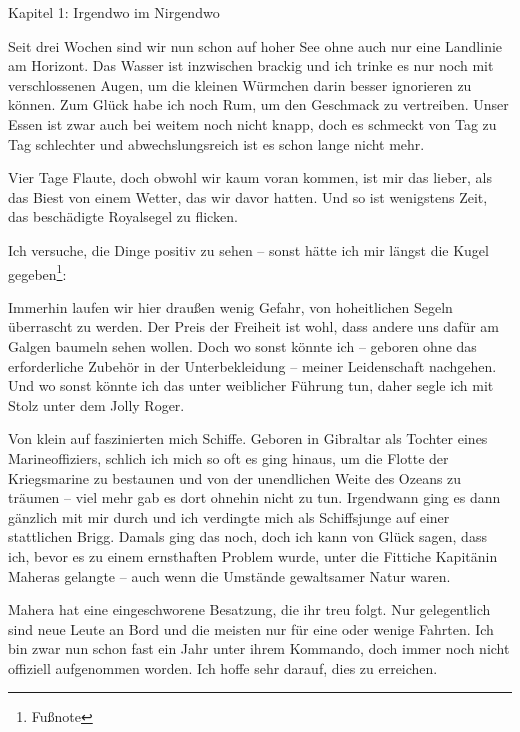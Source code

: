 
{\label{0Kapitel 1: Irgendwo im Nirgendwo}\vspace{0.5cm}\noindent\LARGE Kapitel 1: Irgendwo im Nirgendwo}
\renewcommand{\storychapter}{Kapitel 1: Irgendwo im Nirgendwo}

\vspace{0.5cm}\noindent
Seit drei Wochen sind wir nun schon auf hoher See ohne auch nur eine Landlinie am Horizont. Das Wasser ist inzwischen brackig und ich trinke es nur noch mit verschlossenen Augen, um die kleinen Würmchen darin besser ignorieren zu können. Zum Glück habe ich noch Rum, um den Geschmack zu vertreiben. Unser Essen ist zwar auch bei weitem noch nicht knapp, doch es schmeckt von Tag zu Tag schlechter und abwechslungsreich ist es schon lange nicht mehr.

\vspace{0.5cm}\noindent
Vier Tage Flaute, doch obwohl wir kaum voran kommen, ist mir das lieber, als das Biest von einem Wetter, das wir davor hatten. Und so ist wenigstens Zeit, das beschädigte Royalsegel zu flicken.

Ich versuche, die Dinge positiv zu sehen -- sonst hätte ich mir längst die Kugel gegeben\footnote{Fußnote}:

Immerhin laufen wir hier draußen wenig Gefahr, von hoheitlichen Segeln überrascht zu werden. Der Preis der Freiheit ist wohl, dass andere uns dafür am Galgen baumeln sehen wollen. Doch wo sonst könnte ich -- geboren ohne das erforderliche Zubehör in der Unterbekleidung -- meiner Leidenschaft nachgehen. Und wo sonst könnte ich das unter weiblicher Führung tun, daher segle ich mit Stolz unter dem Jolly Roger.

Von klein auf faszinierten mich Schiffe. Geboren in Gibraltar als Tochter eines Marineoffiziers, schlich ich mich so oft es ging hinaus, um die Flotte der Kriegsmarine zu bestaunen und von der unendlichen Weite des Ozeans zu träumen -- viel mehr gab es dort ohnehin nicht zu tun. Irgendwann ging es dann gänzlich mit mir durch und ich verdingte mich als Schiffsjunge auf einer stattlichen Brigg. Damals ging das noch, doch ich kann von Glück sagen, dass ich, bevor es zu einem ernsthaften Problem wurde, unter die Fittiche{} Kapitänin Maheras gelangte -- auch wenn die Umstände gewaltsamer Natur waren. 

Mahera hat eine eingeschworene Besatzung, die ihr treu folgt. Nur gelegentlich sind neue Leute an Bord und die meisten nur für eine oder wenige Fahrten. Ich bin zwar nun schon fast ein Jahr unter ihrem Kommando, doch immer noch nicht offiziell aufgenommen worden. Ich hoffe sehr darauf, dies zu erreichen.

